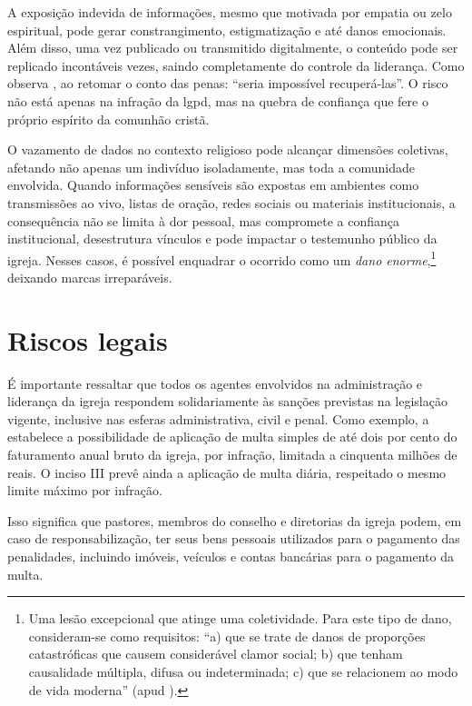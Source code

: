 A exposição indevida de informações, mesmo que motivada por empatia ou zelo espiritual, pode gerar constrangimento, estigmatização e até danos emocionais. Além disso, uma vez publicado ou transmitido digitalmente, o conteúdo pode ser replicado incontáveis vezes, saindo completamente do controle da liderança. Como observa , ao retomar o conto das penas: ``seria impossível recuperá-las''. O risco não está apenas na infração da \gls{lgpd}, mas na quebra de confiança que fere o próprio espírito da comunhão cristã.

O vazamento de dados no contexto religioso pode alcançar dimensões coletivas, afetando não apenas um indivíduo isoladamente, mas toda a comunidade envolvida. Quando informações sensíveis são expostas em ambientes como transmissões ao vivo, listas de oração, redes sociais ou materiais institucionais, a consequência não se limita à dor pessoal, mas compromete a confiança institucional, desestrutura vínculos e pode impactar o testemunho público da igreja. Nesses casos, é possível enquadrar o ocorrido como um \textit{dano enorme},\footnote{Uma lesão excepcional que atinge uma coletividade. Para este tipo de dano, consideram-se como requisitos: ``a) que se trate de danos de proporções catastróficas que causem considerável clamor social; b) que tenham causalidade múltipla, difusa ou indeterminada; c) que se relacionem ao modo de vida moderna'' (apud ).} deixando marcas irreparáveis.

\section{Riscos legais}

É importante ressaltar que todos os agentes envolvidos na administração e liderança da igreja respondem solidariamente às sanções previstas na legislação vigente, inclusive nas esferas administrativa, civil e penal. Como exemplo, a  estabelece a possibilidade de aplicação de multa simples de até dois por cento do faturamento anual bruto da igreja, por infração, limitada a cinquenta milhões de reais. O inciso III prevê ainda a aplicação de multa diária, respeitado o mesmo limite máximo por infração.

Isso significa que pastores, membros do conselho e diretorias da igreja podem, em caso de responsabilização, ter seus bens pessoais utilizados para o pagamento das penalidades, incluindo imóveis, veículos e contas bancárias para o pagamento da multa.

